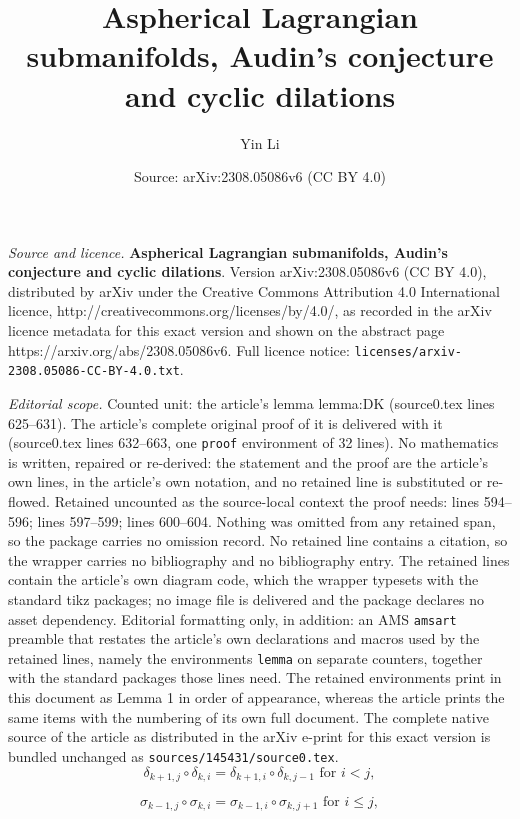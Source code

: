 \documentclass[10pt,a4paper]{amsart}
\title{\textbf{Aspherical Lagrangian submanifolds, Audin's conjecture and cyclic dilations}}
\author{Yin Li}
\date{Source: arXiv:2308.05086v6 (CC BY 4.0)}
\begin{document}
\maketitle

\noindent\emph{Source and licence.} \textbf{Aspherical Lagrangian submanifolds, Audin's conjecture and cyclic dilations}. Version arXiv:2308.05086v6 (CC BY 4.0), distributed by arXiv under the Creative Commons Attribution 4.0 International licence, http://creativecommons.org/licenses/by/4.0/, as recorded in the arXiv licence metadata for this exact version and shown on the abstract page https://arxiv.org/abs/2308.05086v6. Full licence notice: \texttt{licenses/arxiv-2308.05086-CC-BY-4.0.txt}.\par\smallskip

\noindent\textit{Editorial scope.} Counted unit: the article's lemma lemma:DK (source0.tex lines 625--631). The article's complete original proof of it is delivered with it (source0.tex lines 632--663, one \texttt{proof} environment of 32 lines). No mathematics is written, repaired or re-derived: the statement and the proof are the article's own lines, in the article's own notation, and no retained line is substituted or re-flowed.  Retained uncounted as the source-local context the proof needs: lines 594--596; lines 597--599; lines 600--604.  Nothing was omitted from any retained span, so the package carries no omission record.  No retained line contains a citation, so the wrapper carries no bibliography and no bibliography entry.  The retained lines contain the article's own diagram code, which the wrapper typesets with the standard tikz packages; no image file is delivered and the package declares no asset dependency.  Editorial formatting only, in addition: an AMS \texttt{amsart} preamble that restates the article's own declarations and macros used by the retained lines, namely the environments \texttt{lemma} on separate counters, together with the standard packages those lines need.  The retained environments print in this document as Lemma 1 in order of appearance, whereas the article prints the same items with the numbering of its own full document.  The complete native source of the article as distributed in the arXiv e-print for this exact version is bundled unchanged as \texttt{sources/145431/source0.tex}.
\begin{equation}\label{eq:cod}
\delta_{k+1,j}\circ\delta_{k,i}=\delta_{k+1,i}\circ\delta_{k,j-1}\textrm{ for }i<j,
\end{equation}

\begin{equation}\label{eq:cos}
\sigma_{k-1,j}\circ\sigma_{k,i}=\sigma_{k-1,i}\circ\sigma_{k,j+1}\textrm{ for }i\leq j,
\end{equation}
\end{document}
